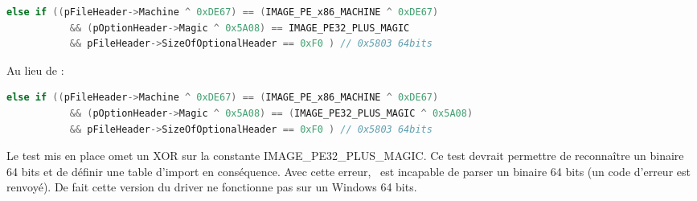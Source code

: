  \begin{center}
 \begin{changemargin}{-1cm}{-1cm}
\begin{lstlisting}[language={C}]
  else if ((pFileHeader->Machine ^ 0xDE67) == (IMAGE_PE_x86_MACHINE ^ 0xDE67) 
           && (pOptionHeader->Magic ^ 0x5A08) == IMAGE_PE32_PLUS_MAGIC 
           && pFileHeader->SizeOfOptionalHeader == 0xF0 ) // 0x5803 64bits
\end{lstlisting}
\hspace{1cm} Au lieu de :
\begin{lstlisting}[language={C}]
  else if ((pFileHeader->Machine ^ 0xDE67) == (IMAGE_PE_x86_MACHINE ^ 0xDE67) 
           && (pOptionHeader->Magic ^ 0x5A08) == (IMAGE_PE32_PLUS_MAGIC ^ 0x5A08) 
           && pFileHeader->SizeOfOptionalHeader == 0xF0 ) // 0x5803 64bits
\end{lstlisting}
 \end{changemargin}
 \end{center}

Le test mis en place omet un XOR sur la constante IMAGE\_PE32\_PLUS\_MAGIC. Ce test devrait permettre de reconnaître un binaire 64 bits et de définir une table d'import en conséquence. Avec cette erreur, \Duqu\ est incapable de parser un binaire 64 bits (un code d'erreur est renvoyé). De fait cette version du driver ne fonctionne pas sur un Windows 64 bits.

